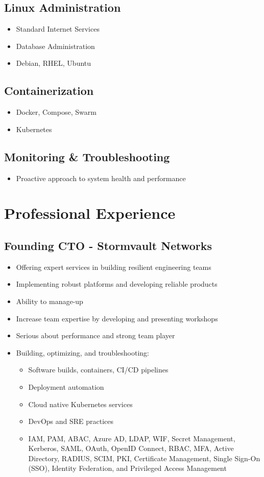 \documentclass[11pt,a4paper]{article}
\begin{document}
\subsection*{Linux Administration}
\label{sec:org532f814}
\begin{itemize}
\item Standard Internet Services
\item Database Administration
\item Debian, RHEL, Ubuntu
\end{itemize}
\subsection*{Containerization}
\label{sec:org3e8ee75}
\begin{itemize}
\item Docker, Compose, Swarm
\item Kubernetes
\end{itemize}
\subsection*{Monitoring \& Troubleshooting}
\label{sec:org177af74}
\begin{itemize}
\item Proactive approach to system health and performance
\end{itemize}
\section*{Professional Experience}
\label{sec:org463e122}

\subsection*{Founding CTO - Stormvault Networks}
\label{sec:org2bb4ac8}
\begin{itemize}
\item Offering expert services in building resilient engineering teams
\item Implementing robust platforms and developing reliable products
\item Ability to manage-up
\item Increase team expertise by developing and presenting workshops
\item Serious about performance and strong team player
\item Building, optimizing, and troubleshooting:
\begin{itemize}
\item Software builds, containers, CI/CD pipelines
\item Deployment automation
\item Cloud native Kubernetes services
\item DevOps and SRE practices
\item IAM, PAM, ABAC, Azure AD, LDAP, WIF, Secret Management, Kerberos, SAML, OAuth, OpenID Connect, RBAC, MFA, Active Directory, RADIUS, SCIM, PKI, Certificate Management, Single Sign-On (SSO), Identity Federation, and Privileged Access Management
\end{itemize}
\end{itemize}
\end{document}
